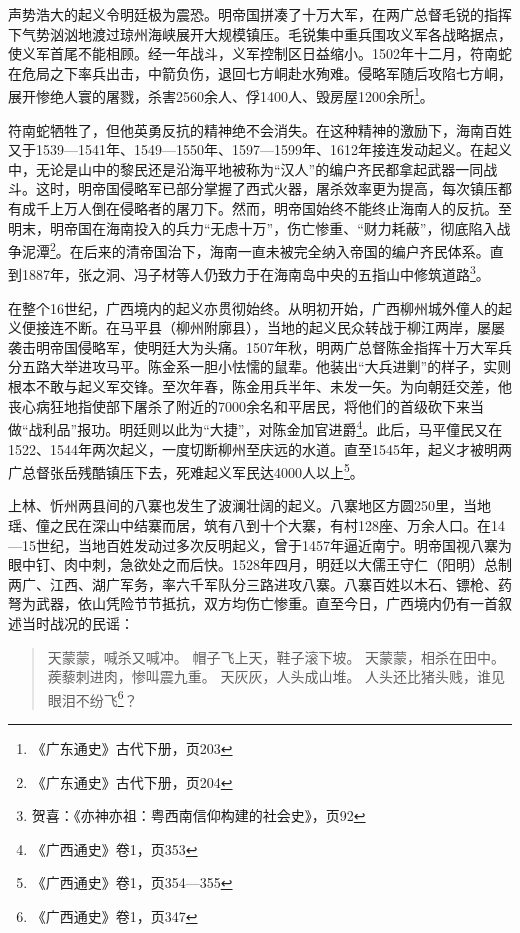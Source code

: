 声势浩大的起义令明廷极为震恐。明帝国拼凑了十万大军，在两广总督毛锐的指挥下气势汹汹地渡过琼州海峡展开大规模镇压。毛锐集中重兵围攻义军各战略据点，使义军首尾不能相顾。经一年战斗，义军控制区日益缩小。1502年十二月，符南蛇在危局之下率兵出击，中箭负伤，退回七方峒赴水殉难。侵略军随后攻陷七方峒，展开惨绝人寰的屠戮，杀害2560余人、俘1400人、毁房屋1200余所\footnote{《广东通史》古代下册，页203}。

符南蛇牺牲了，但他英勇反抗的精神绝不会消失。在这种精神的激励下，海南百姓又于1539—1541年、1549—1550年、1597—1599年、1612年接连发动起义。在起义中，无论是山中的黎民还是沿海平地被称为“汉人”的编户齐民都拿起武器一同战斗。这时，明帝国侵略军已部分掌握了西式火器，屠杀效率更为提高，每次镇压都有成千上万人倒在侵略者的屠刀下。然而，明帝国始终不能终止海南人的反抗。至明末，明帝国在海南投入的兵力“无虑十万”，伤亡惨重、“财力耗蔽”，彻底陷入战争泥潭\footnote{《广东通史》古代下册，页204}。在后来的清帝国治下，海南一直未被完全纳入帝国的编户齐民体系。直到1887年，张之洞、冯子材等人仍致力于在海南岛中央的五指山中修筑道路\footnote{贺喜：《亦神亦祖：粤西南信仰构建的社会史》，页92}。

在整个16世纪，广西境内的起义亦贯彻始终。从明初开始，广西柳州城外僮人的起义便接连不断。在马平县（柳州附廓县），当地的起义民众转战于柳江两岸，屡屡袭击明帝国侵略军，使明廷大为头痛。1507年秋，明两广总督陈金指挥十万大军兵分五路大举进攻马平。陈金系一胆小怯懦的鼠辈。他装出“大兵进剿”的样子，实则根本不敢与起义军交锋。至次年春，陈金用兵半年、未发一矢。为向朝廷交差，他丧心病狂地指使部下屠杀了附近的7000余名和平居民，将他们的首级砍下来当做“战利品”报功。明廷则以此为“大捷”，对陈金加官进爵\footnote{《广西通史》卷1，页353}。此后，马平僮民又在1522、1544年两次起义，一度切断柳州至庆远的水道。直至1545年，起义才被明两广总督张岳残酷镇压下去，死难起义军民达4000人以上\footnote{《广西通史》卷1，页354—355}。

上林、忻州两县间的八寨也发生了波澜壮阔的起义。八寨地区方圆250里，当地瑶、僮之民在深山中结寨而居，筑有八到十个大寨，有村128座、万余人口。在14—15世纪，当地百姓发动过多次反明起义，曾于1457年逼近南宁。明帝国视八寨为眼中钉、肉中刺，急欲处之而后快。1528年四月，明廷以大儒王守仁（阳明）总制两广、江西、湖广军务，率六千军队分三路进攻八寨。八寨百姓以木石、镖枪、药弩为武器，依山凭险节节抵抗，双方均伤亡惨重。直至今日，广西境内仍有一首叙述当时战况的民谣：

\begin{quote}

天蒙蒙，喊杀又喊冲。
帽子飞上天，鞋子滚下坡。
天蒙蒙，相杀在田中。
蒺藜刺进肉，惨叫震九重。
天灰灰，人头成山堆。
人头还比猪头贱，谁见眼泪不纷飞\footnote{《广西通史》卷1，页347}？

\end{quote}


